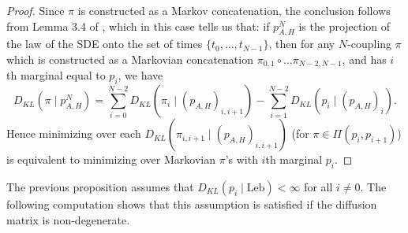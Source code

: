 \documentclass[twoside,11pt]{article}
\begin{document}
\begin{proof}



Since $\pi$ is constructed as a Markov concatenation, the conclusion follows from Lemma 3.4 of \citet{benamou2019entropy}, which in this case tells us that: if $p_{A,H}^{N}$ is the projection
of the law of the SDE onto the set of times $\{t_{0},\ldots,t_{N-1}\}$,
then for any $N$-coupling $\pi$ which is constructed as a Markovian
concatenation $\pi_{0,1}\circ\ldots\pi_{N-2, N-1}$, and has $i$th marginal
equal to $p_{i}$, we have 
\[
D_{KL}(\pi\mid p_{A,H}^{N})=\sum_{i=0}^{N-2}D_{KL}(\pi_{i}\mid (p_{A,H})_{i,i+1}) - \sum_{i=1}^{N-2}D_{KL}(p_i \mid (p_{A,H})_i ).
\]
Hence minimizing over each $D_{KL}(\pi_{i,i+1}\mid (p_{A,H})_{i,i+1})$
(for $\pi\in\Pi(p_{i},p_{i+1})$) is equivalent to minimizing over
Markovian $\pi$'s with $i$th marginal $p_{i}$.

\end{proof}

The previous proposition assumes that $D_{KL}(p_{i}\mid\text{Leb})<\infty$ for all $i\neq 0$. The following computation shows that this assumption is satisfied if the diffusion matrix is non-degenerate. 
\end{document}
